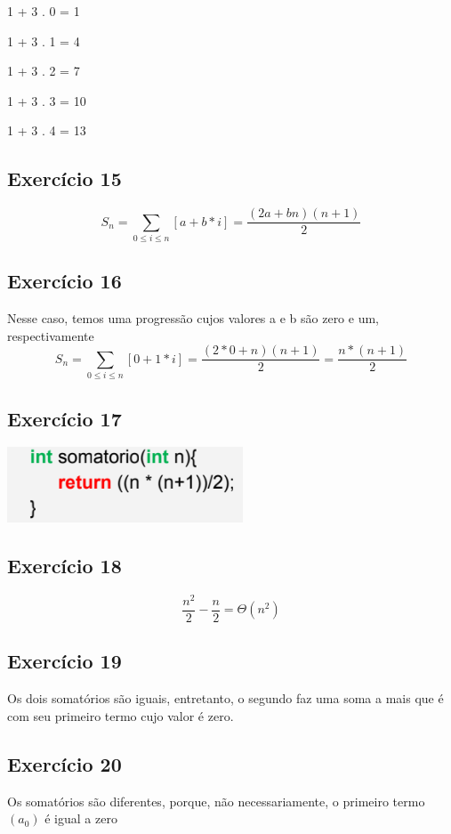 \documentclass[12pt]{article}
\begin{document}
1 + 3 . 0 = 1

1 + 3 . 1 = 4

1 + 3 . 2 = 7

1 + 3 . 3 = 10

1 + 3 . 4 = 13
\subsection{Exercício 15}
\begingroup
\LARGE    
\begin{equation}
    S_n = \sum_{0\leq i\leq n}[a + b * i] = \frac{(2a + bn)(n+1)}{2}
\end{equation}
\endgroup
\subsection{Exercício 16}
Nesse caso, temos uma progressão cujos valores a e b são
zero e um, respectivamente
\begingroup
\LARGE    
\begin{equation}
    S_n = \sum_{0\leq i\leq n}[0 + 1 * i] = \frac{(2*0 + n)(n+1)}{2} = \frac{n*(n+1)}{2}
\end{equation}
\endgroup
\subsection{Exercício 17}
\includegraphics[width=7cm]{3.png}
\subsection{Exercício 18}
\begingroup
\LARGE    
\begin{equation}
    \frac{n^2}{2} - \frac{n}{2} = \Theta(n^2)
\end{equation}
\endgroup
\subsection{Exercício 19}
Os dois somatórios são iguais, entretanto, o segundo faz uma
soma a mais que é com seu primeiro termo cujo valor é zero.
\subsection{Exercício 20}
Os somatórios são diferentes, porque, não necessariamente,
o primeiro termo $(a_0)$ é igual a zero
\end{document}
